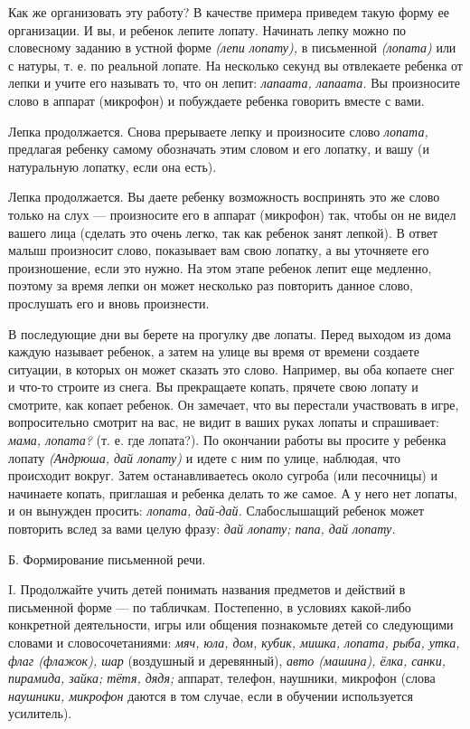 \documentclass[a5paper]{book}
\renewcommand{\emph}[1]{\textit{#1}}
\begin{document}
Как же организовать эту работу? В качестве примера приведем такую форму
ее организации. И вы, и ребенок лепите лопату. Начинать лепку можно по
словесному заданию в устной форме \emph{(лепи лопату),} в письменной
\emph{(лопата)} или с натуры, т. е. по реальной лопате. На несколько
секунд вы отвлекаете ребенка от лепки и учите его называть то, что он
лепит: \emph{лапаата, лапаата.} Вы произносите слово в аппарат
(микрофон) и побуждаете ребенка говорить вместе с вами.

Лепка продолжается. Снова прерываете лепку и произносите слово
\emph{лопата,} предлагая ребенку самому обозначать этим словом и его
лопатку, и вашу (и натуральную лопатку, если она есть).

Лепка продолжается. Вы даете ребенку возможность воспринять это же слово
только на слух --- произносите его в аппарат (микрофон) так, чтобы он не
видел вашего лица (сделать это очень легко, так как ребенок занят
лепкой). В ответ малыш произносит слово, показывает вам свою лопатку, а
вы уточняете его произношение, если это нужно. На этом этапе ребенок
лепит еще медленно, поэтому за время лепки он может несколько раз
повторить данное слово, прослушать его и вновь произнести.

В последующие дни вы берете на прогулку две лопаты. Перед выходом из
дома каждую называет ребенок, а затем на улице вы время от времени
создаете ситуации, в которых он может сказать это слово. Например, вы
оба копаете снег и что-то строите из снега. Вы прекращаете копать,
прячете свою лопату и смотрите, как копает ребенок. Он замечает, что вы
перестали участвовать в игре, вопросительно смотрит на вас, не видит в
ваших руках лопаты и спрашивает: \emph{мама, лопата?} (т. е. где
лопата?). По окончании работы вы просите у ребенка лопату
\emph{(Андрюша, дай лопату)} и идете с ним по улице, наблюдая, что
происходит вокруг. Затем останавливаетесь около сугроба (или песочницы)
и начинаете копать, приглашая и ребенка делать то же самое. А у него нет
лопаты, и он вынужден просить: \emph{лопата, дай-дай.} Слабослышащий
ребенок может повторить вслед за вами целую фразу: \emph{дай лопату;
папа, дай лопату.}

Б. Формирование письменной речи.

I. Продолжайте учить детей понимать названия предметов и действий в
письменной форме --- по табличкам. Постепенно, в условиях какой-либо
конкретной деятельности, игры или общения познакомьте детей со
следующими словами и словосочетаниями: \emph{мяч, юла, дом, кубик,
мишка, лопата, рыба, утка, флаг (флажок), шар} (воздушный и деревянный),
\emph{авто (машина), ёлка, санки, пирамида, зайка; тётя, дядя;} аппарат,
телефон, наушники, микрофон (слова \emph{наушники, микрофон} даются в
том случае, если в обучении используется усилитель).
\end{document}
